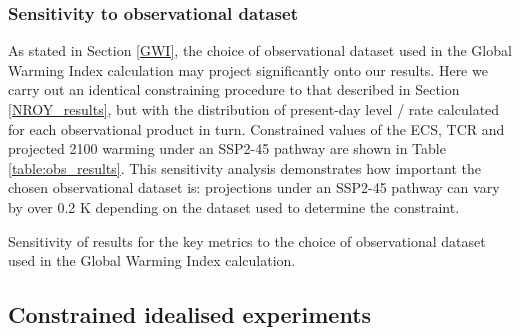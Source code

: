 \documentclass[gmd, manuscript]{copernicus}
\providecommand{\DIFadd}[1]{{\protect\color{blue}#1}} %
\providecommand{\DIFaddend}{} %
\providecommand{\DIFaddFL}[1]{\DIFadd{#1}} %
\begin{document}
\subsubsection{\DIFadd{Sensitivity to observational dataset}} \label{obsv_data_sensitivity}
\DIFadd{As stated in Section \ref{GWI}, the choice of observational dataset used in the Global Warming Index calculation may project significantly onto our results. Here we carry out an identical constraining procedure to that described in Section \ref{NROY_results}, but with the distribution of present-day level / rate calculated for each observational product in turn. Constrained values of the ECS, TCR and projected 2100 warming under an SSP2-45 pathway are shown in Table \ref{table:obs_results}. This sensitivity analysis demonstrates how important the chosen observational dataset is: projections under an SSP2-45 pathway can vary by over 0.2 K depending on the dataset used to determine the constraint. 
}\begin{table}[h]
    \caption{\DIFaddFL{Sensitivity of results for the key metrics to the choice of observational dataset used in the Global Warming Index calculation.}}
    \label{table:obs_results}
    {\footnotesize
    
    }
\end{table}
\clearpage
\DIFaddend \subsection{Constrained idealised experiments} \label{NROY_idealised}
\end{document}
